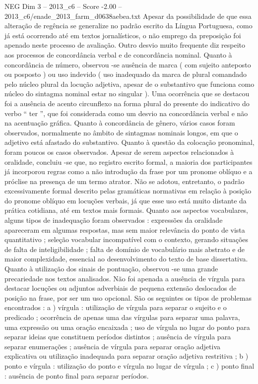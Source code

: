 \begin{textsample}{NEG Dim 3 – 2013\_c6 – Score -2.00 – 2013\_c6/enade\_2013\_farm\_d0638aebea.txt}
Apesar da possibilidade de que essa alteração de regência se generalize no padrão escrito da Língua Portuguesa, como já está ocorrendo até em textos jornalísticos, o não emprego da preposição foi apenado neste processo de avaliação.
Outro desvio muito frequente diz respeito aos processos de concordância verbal e de concordância nominal.
Quanto à concordância de número, observou -se ausência de marca ( com sujeito anteposto ou posposto ) ou uso indevido ( uso inadequado da marca de plural comandado pelo núcleo plural da locução adjetiva, apesar de o substantivo que funciona como núcleo do sintagma nominal estar no singular ).
Uma ocorrência que se destacou foi a ausência de acento circunflexo na forma plural do presente do indicativo do verbo “ ter ”, que foi considerada como um desvio na concordância verbal e não na acentuação gráfica.
Quanto à concordância de gênero, vários casos foram observados, normalmente no âmbito de sintagmas nominais longos, em que o adjetivo está afastado do substantivo.
Quanto à questão da colocação pronominal, foram poucos os casos observados.
Apesar de serem aspectos relacionados à oralidade, concluiu -se que, no registro escrito formal, a maioria dos participantes já incorporou regras como a não introdução da frase por um pronome oblíquo e a próclise na presença de um termo atrator.
Não se adotou, entretanto, o padrão excessivamente formal descrito pelas gramáticas normativas em relação à posição do pronome oblíquo em locuções verbais, já que esse uso está muito distante da prática cotidiana, até em textos mais formais.
Quanto aos aspectos vocabulares, alguns tipos de inadequação foram observados : expressões da oralidade apareceram em algumas respostas, mas sem maior relevância do ponto de vista quantitativo ; seleção vocabular incompatível com o contexto, gerando situações de falta de inteligibilidade ; falta de domínio de vocabulário mais abstrato e de maior complexidade, essencial ao desenvolvimento do texto de base dissertativa.
Quanto à utilização dos sinais de pontuação, observou -se uma grande precariedade nos textos analisados.
Não foi apenada a ausência de vírgula para destacar locuções ou adjuntos adverbiais de pequena extensão deslocados de posição na frase, por ser um uso opcional.
São os seguintes os tipos de problemas encontrados : a ) vírgula : utilização de vírgula para separar o sujeito e o predicado ; ocorrência de apenas uma das vírgulas para separar uma palavra, uma expressão ou uma oração encaixada ; uso de vírgula no lugar do ponto para separar ideias que constituem períodos distintos ; ausência de vírgula para separar enumerações ; ausência de vírgula para separar oração adjetiva explicativa ou utilização inadequada para separar oração adjetiva restritiva ; b ) ponto e vírgula : utilização do ponto e vírgula no lugar de vírgula ; c ) ponto final : ausência de ponto final para separar períodos.

\end{textsample}
